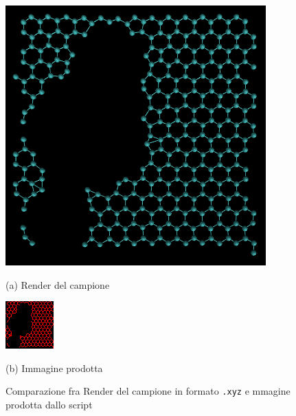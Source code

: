 \documentclass[12pt,a4paper,openright,twoside]{report}
\begin{document}
\begin{figure}[h]
\begin{minipage}[t]{0.49\linewidth}
\centering
\includegraphics[width=\linewidth]{graphene_67.png}

(a) Render del campione
\end{minipage}%
\hfill\vrule\hfill
\begin{minipage}[t]{0.49\linewidth}
\centering
\includegraphics[width=\linewidth]{graphene_67_bonds.png}

(b)  Immagine prodotta
\end{minipage}
\caption{Comparazione fra Render del campione in formato \texttt{.xyz} e mmagine prodotta dallo script }
\end{figure}
\end{document}

